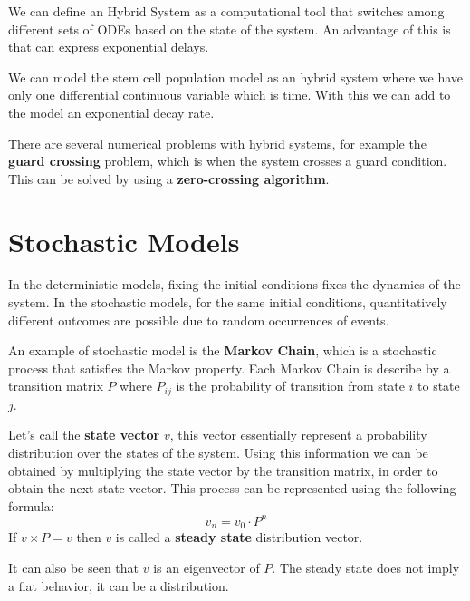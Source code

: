 We can define an Hybrid System as a computational tool that switches among
different sets of ODEs based on the state of the system. An advantage of this is
that can express exponential delays.

We can model the stem cell population model as an hybrid system where we have
only one differential continuous variable which is time. With this we can add to
the model an exponential decay rate.

There are several numerical problems with hybrid systems, for example the
\textbf{guard crossing} problem, which is when the system crosses a guard
condition. This can be solved by using a \textbf{zero-crossing algorithm}.
\section{Stochastic Models}
In the deterministic models, fixing the initial conditions fixes the dynamics of
the system. In the stochastic models, for the same initial conditions,
quantitatively different outcomes are possible due to random occurrences of
events.

An example of stochastic model is the \textbf{Markov Chain}, which is a
stochastic process that satisfies the Markov property. Each Markov Chain is
describe by a transition matrix $P$ where $P_{ij}$ is the probability of
transition from state $i$ to state $j$.

Let's call the \textbf{state vector} $v$, this vector essentially represent a
probability distribution over the states of the system. Using this information
we can be obtained by multiplying the state vector by the transition matrix,
in order to obtain the next state vector. This process can be represented using
the following formula:
\begin{equation}
    v_{n} = v_0 \cdot P^n
\end{equation}
If $v\times P = v$ then $v$ is called a \textbf{steady state} distribution vector.
\begin{note}
    It can also be seen that $v$ is an eigenvector of $P$. The steady state does
    not imply a flat behavior, it can be a distribution.
\end{note}
